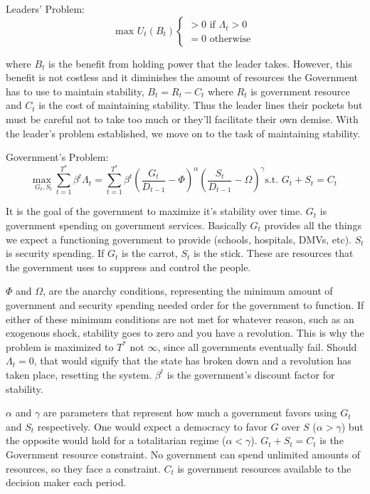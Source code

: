 \documentclass[12pt]{article}
\begin{document}
\begin{spacing}{1.5}
\vspace{.5 em}
\noindent Leaders' Problem:
\begin{equation}
	 \text{max } U_t(B_t) \begin{cases}
		>0 \text{ if } \Lambda_t > 0 \\
		= 0 \text{ otherwise} 	
	\end{cases}
\end{equation} 

\noindent where $B_t$ is the benefit from holding power that the leader takes. However, this benefit is not costless and it diminishes the amount of resources the Government has to use to maintain stability, $B_t=R_t-C_t$ where $R_t$ is government resource and $C_t$ is the cost of maintaining stability. Thus the leader lines their pockets but must be careful not to take too much or they'll facilitate their own demise. With the leader's problem established, we move on to the task of maintaining stability.   
\vspace{.5 em}

\noindent Government's Problem:
\begin{equation}
{\underset{G_t,S_t}{\text{max }}} \sum\limits_{t=1}^{T^*} \beta^t {\Lambda}_t = \sum\limits_{t=1}^{T^*} \beta^t\left(\frac{G_t}{D_{t-1}}-\Phi\right)^\alpha \left(\frac{S_t}{D_{t-1}}-\Omega\right)^\gamma   \text{s.t. } G_t+S_t=C_t
\end{equation}

It is the goal of the government to maximize it's stability over time. $G_t$ is government spending on government services. Basically $G_t$ provides all the things we expect a functioning government to provide (schools, hospitals, DMVs, etc). $S_t$ is security spending. If $G_t$ is the carrot, $S_t$ is the stick. These are resources that the government uses to suppress and control the people. 

$\Phi$ and $\Omega$, are the anarchy conditions, representing the minimum amount of government and security spending needed order for the government to function. If either of these minimum conditions are not met for whatever reason, such as an exogenous shock, stability goes to zero and you have a revolution. This is why the problem is maximized to $T^*$ not $\infty$, since all governments eventually fail. Should $\Lambda_t=0$, that would signify that the state has broken down and a revolution has taken place, resetting the system. $\beta^t$ is the government's discount factor for stability. 

$\alpha$ and $\gamma $  are parameters that represent how much a government favors using $G_t$ and $S_t$ respectively. One would expect a democracy to favor $G$ over $S$ ($\alpha > \gamma$) but the opposite would hold for a totalitarian regime ($\alpha < \gamma $). $G_t+S_t=C_t$ is the Government resource constraint. No government can spend unlimited amounts of resources, so they face a constraint. $C_t$ is government resources available to the decision maker each period. 


\end{spacing}
\end{document}
